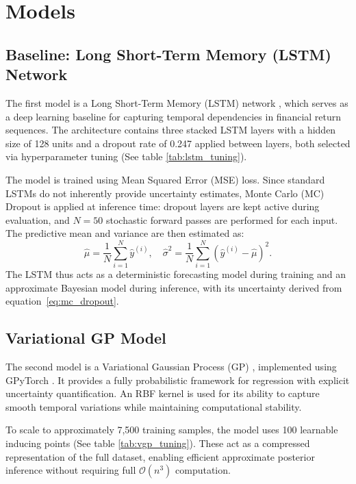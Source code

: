 \section{Models}
\label{sec:models}

\subsection{Baseline: Long Short-Term Memory (LSTM) Network}

The first model is a Long Short-Term Memory (LSTM) network \parencite{hochreiter1997lstm}, which serves as a deep learning baseline for capturing temporal dependencies in financial return sequences. The architecture contains three stacked LSTM layers with a hidden size of 128 units and a dropout rate of 0.247 applied between layers, both selected via hyperparameter tuning (See table \ref{tab:lstm_tuning}).

The model is trained using Mean Squared Error (MSE) loss. Since standard LSTMs do not inherently provide uncertainty estimates, Monte Carlo (MC) Dropout \parencite{gal2016dropout} is applied at inference time: dropout layers are kept active during evaluation, and $N=50$ stochastic forward passes are performed for each input. The predictive mean and variance are then estimated as:
\begin{equation}
    \hat{\mu} = \frac{1}{N}\sum_{i=1}^{N}\hat{y}^{(i)}, \quad
    \hat{\sigma}^2 = \frac{1}{N}\sum_{i=1}^{N}(\hat{y}^{(i)} - \hat{\mu})^2.
    \label{eq:mc_dropout}
\end{equation}
The LSTM thus acts as a deterministic forecasting model during training and an approximate Bayesian model during inference, with its uncertainty derived from equation~\ref{eq:mc_dropout}.

\subsection{Variational GP Model}

The second model is a Variational Gaussian Process (GP) \parencite{10.7551/mitpress/3206.001.0001, titsias2009variational}, implemented using GPyTorch \parencite{gardner2021gpytorchblackboxmatrixmatrixgaussian}. It provides a fully probabilistic framework for regression with explicit uncertainty quantification. An RBF kernel is used for its ability to capture smooth temporal variations while maintaining computational stability.

To scale to approximately 7,500 training samples, the model uses 100 learnable inducing points \parencite{titsias2009variational} (See table \ref{tab:vgp_tuning}). These act as a compressed representation of the full dataset, enabling efficient approximate posterior inference without requiring full $\mathcal{O}(n^3)$ computation.


